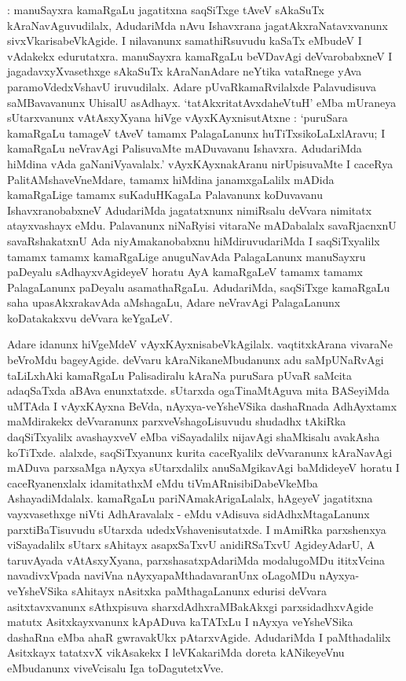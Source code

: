 : manuSayxra kamaRgaLu jagatitxna saqSiTxge tAveV sAkaSuTx kAraNavAguvudilalx, AdudariMda nAvu Ishavxrana jagatAkxraNatavxvanunx sivxVkarisabeVkAgide. I nilavanunx samathiRsuvudu kaSaTx eMbudeV I vAdakekx edurutatxra. manuSayxra kamaRgaLu beVDavAgi deVvarobabxneV I jagadavxyXvasethxge sAkaSuTx kAraNanAdare neYtika vataRnege yAva paramoVdedxVshavU iruvudilalx. Adare pUvaRkamaRvilalxde Palavudisuva saMBavavanunx UhisalU asAdhayx. `tatAkxritatAvxdaheVtuH' eMba mUraneya sUtarxvanunx vAtAsxyXyana hiVge vAyxKAyxnisutAtxne : `puruSara kamaRgaLu tamageV tAveV tamamx PalagaLanunx huTiTxsikoLaLxlAravu; I kamaRgaLu neVravAgi PalisuvaMte mADuvavanu Ishavxra. AdudariMda hiMdina vAda gaNaniVyavalalx.' vAyxKAyxnakAranu nirUpisuvaMte I caceRya PalitAMshaveVneMdare, tamamx hiMdina janamxgaLalilx mADida kamaRgaLige tamamx suKaduHKagaLa Palavanunx koDuvavanu IshavxranobabxneV AdudariMda jagatatxnunx nimiRsalu deVvara nimitatx atayxvashayx eMdu. Palavanunx niNaRyisi vitaraNe mADabalalx savaRjacnxnU savaRshakatxnU Ada niyAmakanobabxnu hiMdiruvudariMda I saqSiTxyalilx tamamx tamamx kamaRgaLige anuguNavAda PalagaLanunx manuSayxru paDeyalu sAdhayxvAgideyeV horatu AyA kamaRgaLeV tamamx tamamx PalagaLanunx paDeyalu asamathaRgaLu. AdudariMda, saqSiTxge kamaRgaLu saha upasAkxrakavAda aMshagaLu, Adare neVravAgi PalagaLanunx koDatakakxvu deVvara keYgaLeV.

Adare idanunx hiVgeMdeV vAyxKAyxnisabeVkAgilalx. vaqtitxkArana vivaraNe beVroMdu bageyAgide. deVvaru kAraNikaneMbudanunx adu saMpUNaRvAgi taLiLxhAki kamaRgaLu Palisadiralu kAraNa puruSara pUvaR saMcita adaqSaTxda aBAva enunxtatxde. sUtarxda ogaTinaMtAguva mita BASeyiMda uMTAda I vAyxKAyxna BeVda, nAyxya-veYsheVSika dashaRnada AdhAyxtamx maMdirakekx deVvaranunx parxveVshagoLisuvudu shudadhx tAkiRka daqSiTxyalilx avashayxveV eMba viSayadalilx nijavAgi shaMkisalu avakAsha koTiTxde. alalxde, saqSiTxyanunx kurita caceRyalilx deVvaranunx kAraNavAgi mADuva parxsaMga nAyxya sUtarxdalilx anuSaMgikavAgi baMdideyeV horatu I caceRyanenxlalx idamitathxM eMdu tiVmARnisibiDabeVkeMba AshayadiMdalalx. kamaRgaLu pariNAmakArigaLalalx, hAgeyeV jagatitxna vayxvasethxge niVti AdhAravalalx - eMdu vAdisuva sidAdhxMtagaLanunx parxtiBaTisuvudu sUtarxda udedxVshavenisutatxde. I mAmiRka parxshenxya viSayadalilx sUtarx sAhitayx asapxSaTxvU anidiRSaTxvU AgideyAdarU, A taruvAyada vAtAsxyXyana, parxshasatxpAdariMda modalugoMDu ititxVcina navadivxVpada naviVna nAyxyapaMthadavaranUnx oLagoMDu nAyxya-veYsheVSika sAhitayx nAsitxka paMthagaLanunx edurisi deVvara asitxtavxvanunx sAthxpisuva sharxdAdhxraMBakAkxgi parxsidadhxvAgide matutx Asitxkayxvanunx kApADuva kaTATxLu I nAyxya veYsheVSika dashaRna eMba ahaR gwravakUkx pAtarxvAgide. AdudariMda I paMthadalilx Asitxkayx tatatxvX vikAsakekx I leVKakariMda doreta kANikeyeVnu eMbudanunx viveVcisalu Iga toDagutetxVve.

